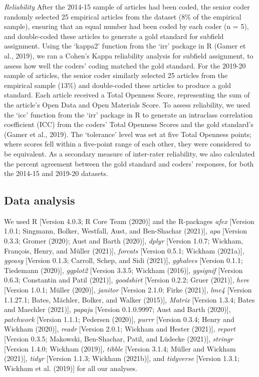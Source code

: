 \documentclass[
  english,
  man,floatsintext]{apa6}
\begin{document}
\emph{Reliability} After the 2014-15 sample of articles had been coded, the senior coder randomly selected 25 empirical articles from the dataset (8\% of the empirical sample), ensuring that an equal number had been coded by each coder (n = 5), and double-coded these articles to generate a gold standard for subfield assignment. Using the `kappa2' function from the `irr' package in R (Gamer et al., 2019), we ran a Cohen's Kappa reliability analysis for subfield assignment, to assess how well the coders' coding matched the gold standard.
For the 2019-20 sample of articles, the senior coder similarly selected 25 articles from the empirical sample (13\%) and double-coded these articles to produce a gold standard. Each article received a Total Openness Score, representing the sum of the article's Open Data and Open Materials Score. To assess reliability, we used the `icc' function from the `irr' package in R to generate an intraclass correlation coefficient (ICC) from the coders' Total Openness Scores and the gold standard's (Gamer et al., 2019). The `tolerance' level was set at five Total Openness points; where scores fell within a five-point range of each other, they were considered to be equivalent.
As a secondary measure of inter-rater reliability, we also calculated the percent agreement between the gold standard and coders' responses, for both the 2014-15 and 2019-20 datasets.

\hypertarget{data-analysis}{%
\subsection{Data analysis}\label{data-analysis}}

We used R {[}Version 4.0.3; R Core Team (2020){]} and the R-packages \emph{afex} {[}Version 1.0.1; Singmann, Bolker, Westfall, Aust, and Ben-Shachar (2021){]}, \emph{apa} {[}Version 0.3.3; Gromer (2020); Aust and Barth (2020){]}, \emph{dplyr} {[}Version 1.0.7; Wickham, François, Henry, and Müller (2021){]}, \emph{forcats} {[}Version 0.5.1; Wickham (2021a){]}, \emph{ggeasy} {[}Version 0.1.3; Carroll, Schep, and Sidi (2021){]}, \emph{gghalves} {[}Version 0.1.1; Tiedemann (2020){]}, \emph{ggplot2} {[}Version 3.3.5; Wickham (2016){]}, \emph{ggsignif} {[}Version 0.6.3; Constantin and Patil (2021){]}, \emph{goodshirt} {[}Version 0.2.2; Gruer (2021){]}, \emph{here} {[}Version 1.0.1; Müller (2020){]}, \emph{janitor} {[}Version 2.1.0; Firke (2021){]}, \emph{lme4} {[}Version 1.1.27.1; Bates, Mächler, Bolker, and Walker (2015){]}, \emph{Matrix} {[}Version 1.3.4; Bates and Maechler (2021){]}, \emph{papaja} {[}Version 0.1.0.9997; Aust and Barth (2020){]}, \emph{patchwork} {[}Version 1.1.1; Pedersen (2020){]}, \emph{purrr} {[}Version 0.3.4; Henry and Wickham (2020){]}, \emph{readr} {[}Version 2.0.1; Wickham and Hester (2021){]}, \emph{report} {[}Version 0.3.5; Makowski, Ben-Shachar, Patil, and Lüdecke (2021){]}, \emph{stringr} {[}Version 1.4.0; Wickham (2019){]}, \emph{tibble} {[}Version 3.1.4; Müller and Wickham (2021){]}, \emph{tidyr} {[}Version 1.1.3; Wickham (2021b){]}, and \emph{tidyverse} {[}Version 1.3.1; Wickham et al. (2019){]} for all our analyses.
\end{document}
